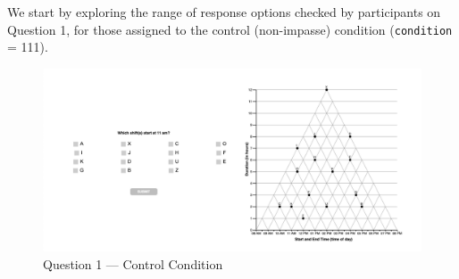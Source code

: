 \documentclass[
  letterpaper,
  DIV=11,
  numbers=noendperiod]{scrreprt}
\begin{document}
We start by exploring the range of response options checked by
participants on Question 1, for those assigned to the control
(non-impasse) condition (\texttt{condition} = 111).

\begin{figure}

{\centering \includegraphics{analysis/SGC3A/static/questions/Q1_111.png}

}

\caption{\label{fig-Q1-111}Question 1 --- Control Condition}

\end{figure}
\end{document}
